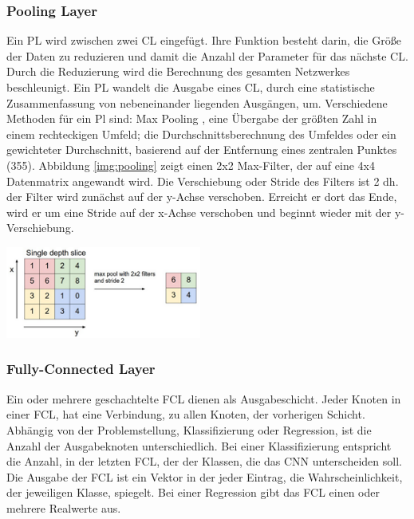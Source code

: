 \documentclass[twosided,a4,10pt]{article}
\begin{document}
\begin{multicols}{2}
		\subsubsection*{Pooling Layer}
		Ein PL wird zwischen zwei CL eingefügt. Ihre Funktion besteht darin, die Größe der Daten zu reduzieren und damit die Anzahl der Parameter für das nächste CL. Durch die Reduzierung wird die Berechnung des gesamten Netzwerkes beschleunigt. \cite{karpathy}\newline Ein PL wandelt die Ausgabe eines CL, durch eine statistische Zusammenfassung von nebeneinander liegenden Ausgängen, um. Verschiedene Methoden für ein Pl sind: Max Pooling \cite{zhou}, eine Übergabe der größten Zahl in einem rechteckigen Umfeld; die Durchschnittsberechnung des Umfeldes oder ein gewichteter Durchschnitt, basierend auf der Entfernung eines zentralen Punktes \cite{goodfellow}(355).\newline
		Abbildung \ref{img:pooling} zeigt einen 2x2 Max-Filter, der auf eine 4x4 Datenmatrix angewandt wird. Die Verschiebung oder Stride des Filters ist 2 dh. der Filter wird zunächst auf der y-Achse verschoben. Erreicht er dort das Ende, wird er um eine Stride auf der x-Achse verschoben und beginnt wieder mit der y-Verschiebung.\newline\\
		\begin{minipage}{0.4\textwidth}
			\centering
			\includegraphics{img/pooling.png}
			\label{img:pooling}
		\end{minipage}\newline
		\subsubsection*{Fully-Connected Layer}
		Ein oder mehrere geschachtelte FCL dienen als Ausgabeschicht. Jeder Knoten in einer FCL, hat eine Verbindung, zu allen Knoten, der vorherigen Schicht. Abhängig von der Problemstellung, Klassifizierung oder Regression, ist die Anzahl der Ausgabeknoten unterschiedlich. Bei einer Klassifizierung entspricht die Anzahl, in der letzten FCL, der der Klassen, die das CNN unterscheiden soll. Die Ausgabe der FCL ist ein Vektor in der jeder Eintrag, die Wahrscheinlichkeit, der jeweiligen Klasse, spiegelt. Bei einer Regression gibt das FCL einen oder mehrere Realwerte aus. \cite{karpathy}

\end{multicols}
\end{document}
